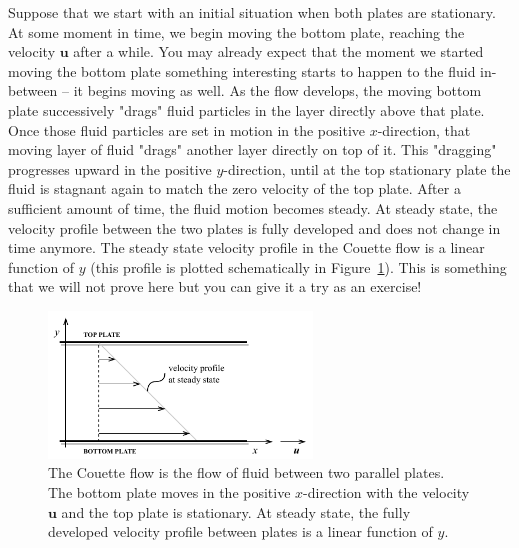 \documentclass[10pt,twocolumn]{article}
\begin{document}
Suppose that we start with an initial situation when both plates are stationary. At some moment in time, we begin moving the bottom plate, reaching the velocity $\mathbf{u}$ after a while. You may already expect that the moment we started moving the bottom plate something interesting starts to happen to the fluid in-between -- it begins moving as well. As the flow develops, the moving bottom plate successively "drags" fluid particles in the layer directly above that plate. Once those fluid particles are set in motion in the positive $x$-direction, that moving layer of fluid "drags" another layer directly on top of it. This "dragging" progresses upward in the positive $y$-direction, until at the top stationary plate the fluid is stagnant again to match the zero velocity of the top plate. After a sufficient amount of time, the fluid motion becomes steady. At steady state, the velocity profile between the two plates is fully developed and does not change in time anymore. The steady state velocity profile in the Couette flow is a linear function of $y$ (this profile is plotted schematically in Figure~\ref{fig:couette-flow}). This is something that we will not prove here but you can give it a try as an exercise!
\begin{figure}[H]
\centering\includegraphics[width=7cm]{couette-flow.pdf}
\caption{The Couette flow is the flow of fluid between two parallel plates. The bottom plate moves in the positive $x$-direction with the velocity $\mathbf{u}$ and the top plate is stationary. At steady state, the fully developed velocity profile between plates is a linear function of $y$.}
\label{fig:couette-flow}
\end{figure}
\end{document}
